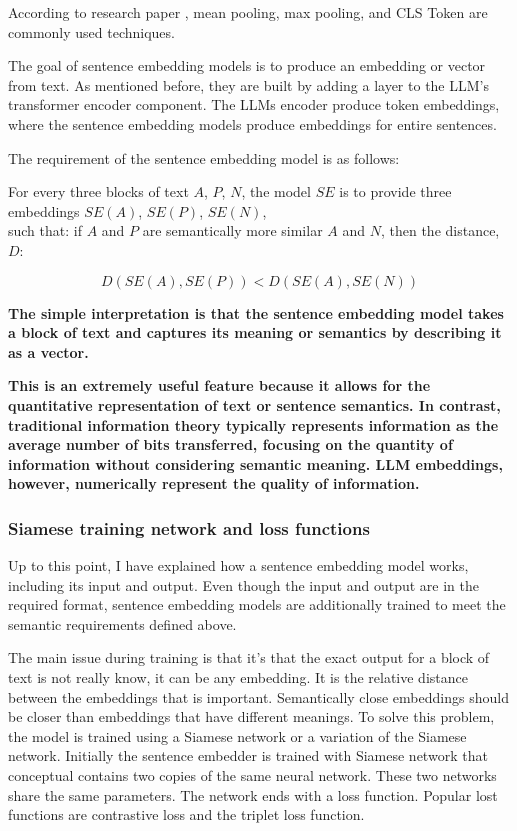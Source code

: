 \documentclass{wseas}
\begin{document}
According to research paper \cite{sbert}, mean
pooling, max pooling, and CLS Token are commonly used techniques.

The goal of sentence embedding models is to produce an embedding or
vector from text. As mentioned before, they are built by adding a layer
to the LLM's transformer encoder component. The LLMs encoder produce token
embeddings, where the sentence embedding models produce embeddings for
entire sentences.

The requirement of the sentence embedding model is as follows:

For every three blocks of text \(A\), \(P\), \(N\), the model \(SE\) is
to provide three embeddings \(SE(A)\), \(SE(P)\), \(SE(N)\),\\
such that: if \(A\) and \(P\) are semantically more similar \(A\) and
\(N\), then the distance, $D$: 

\begin{equation}
   D(SE(A), SE(P)) < D(SE(A), SE(N))
\end{equation}

\textbf{The simple interpretation is that the sentence embedding model
takes a block of text and captures its meaning or semantics by
describing it as a vector.}

\textbf{This is an extremely useful feature because it allows for the 
quantitative representation of text or sentence semantics. In contrast, 
traditional information theory typically represents information as the 
average number of bits transferred, focusing on the quantity of information 
without considering semantic meaning. LLM embeddings, however, numerically 
represent the quality of information.}

\subsubsection{Siamese training network and loss functions}

Up to this point, I have explained how a sentence embedding model works,
including its input and output. Even though the input and output are in
the required format, sentence embedding models are additionally trained
to meet the semantic requirements defined above.

The main issue during training is that it's that the exact output for a 
block of text is not really know, it can be any embedding. It is the relative
distance between the embeddings that is important. Semantically close
embeddings should be closer than embeddings that have different
meanings. To solve this problem, the model is trained using a Siamese
network or a variation of the Siamese network. Initially the sentence
embedder is trained with Siamese network that conceptual contains two
copies of the same neural network. These two networks share the same
parameters. The network ends with a loss function. Popular lost
functions are contrastive loss and the triplet loss function.
\end{document}
